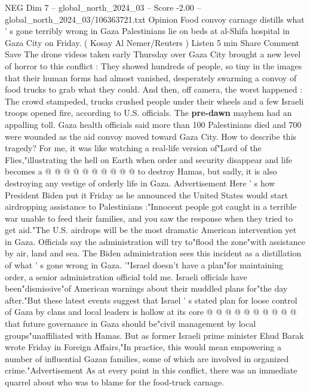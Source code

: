 \begin{textsample}{NEG Dim 7 – global\_north\_2024\_03 – Score -2.00 – global\_north\_2024\_03/106363721.txt}  \label{ex:f7_neg_416}
Opinion Food convoy carnage distills what ' s gone terribly wrong in Gaza Palestinians lie on beds at al-Shifa hospital in Gaza City on Friday. ( Kosay Al Nemer/Reuters ) Listen 5 min Share Comment Save The drone videos taken early Thursday over Gaza City brought a new level of horror to this conflict : They showed hundreds of people, so tiny in the images that their human forms had almost vanished, desperately swarming a convoy of food trucks to grab what they could.
And then, off camera, the worst happened : The crowd stampeded, trucks crushed people under their wheels and a few Israeli troops opened fire, according to U.S. officials.
The \textbf{pre-dawn} mayhem had an appalling toll.
Gaza health officials said more than 100 Palestinians died and 700 were wounded as the aid convoy moved toward Gaza City.
How to describe this tragedy?
For me, it was like watching a real-life version of"Lord of the Flies,"illustrating the hell on Earth when order and security disappear and life becomes a @ @ @ @ @ @ @ @ @ @ to destroy Hamas, but sadly, it is also destroying any vestige of orderly life in Gaza.
Advertisement Here ' s how President Biden put it Friday as he announced the United States would start airdropping assistance to Palestinians :"Innocent people got caught in a terrible war unable to feed their families, and you saw the response when they tried to get aid."The U.S. airdrops will be the most dramatic American intervention yet in Gaza.
Officials say the administration will try to"flood the zone"with assistance by air, land and sea.
The Biden administration sees this incident as a distillation of what ' s gone wrong in Gaza. '"Israel doesn't have a plan"for maintaining order, a senior administration official told me.
Israeli officials have been"dismissive"of American warnings about their muddled plans for"the day after."But these latest events suggest that Israel ' s stated plan for loose control of Gaza by clans and local leaders is hollow at its core @ @ @ @ @ @ @ @ @ @ that future governance in Gaza should be"civil management by local groups"unaffiliated with Hamas.
But as former Israeli prime minister Ehud Barak wrote Friday in Foreign Affairs,"In practice, this would mean empowering a number of influential Gazan families, some of which are involved in organized crime."Advertisement As at every point in this conflict, there was an immediate quarrel about who was to blame for the food-truck carnage.

\end{textsample}
